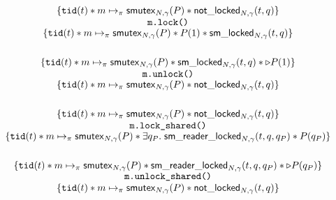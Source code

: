 \[
\begin{array}{@{}c@{}}
\{\currentthread{t} \ast m \mapsto_\pi \smutex{N, \gamma}{P}\ast\notlocked{N, \gamma}{t}{q}\} \\
  \texttt{m.lock()} \\[-1pt]
\{\currentthread{t} \ast m \mapsto_\pi \smutex{N, \gamma}{P}\ast P(1)\ast\smlocked{N, \gamma}{t}{q}\} \\[1.8em]

\{\currentthread{t} \ast m \mapsto_\pi \smutex{N, \gamma}{P}\ast\smlocked{N, \gamma}{t}{q}\ast\triangleright P(1)\}\\
  \texttt{m.unlock()} \\[-1pt]
\{\currentthread{t} \ast m \mapsto_\pi \smutex{N, \gamma}{P}\ast\notlocked{N, \gamma}{t}{q}\} \\[1.8em]

\{\currentthread{t} \ast m \mapsto_\pi \smutex{N, \gamma}{P}\ast\notlocked{N, \gamma}{t}{q}\}\\
  \texttt{m.lock\_shared()} \\[-1pt]
\{\currentthread{t} \ast m \mapsto_\pi \smutex{N, \gamma}{P}\ast\exists q_P.\;\smreaderlocked{N, \gamma}{t}{q}{q_P} \ast P(q_P)\} \\[1.8em]

\{\currentthread{t} \ast m \mapsto_\pi \smutex{N, \gamma}{P}\ast\smreaderlocked{N, \gamma}{t}{q}{q_P}
  \ast\triangleright P(q_P)\} \\[-1pt]
  \texttt{m.unlock\_shared()}  \\
\{\currentthread{t} \ast m \mapsto_\pi \smutex{N, \gamma}{P}\ast\notlocked{N, \gamma}{t}{q}\}
\end{array}
\]

